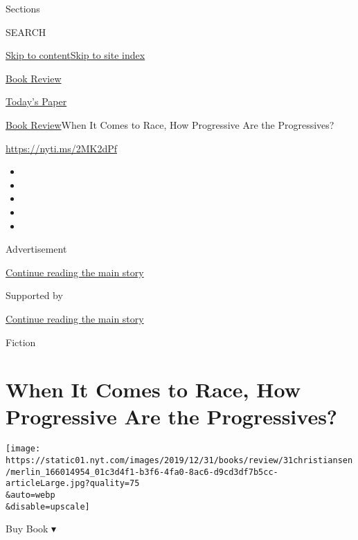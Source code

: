 Sections

SEARCH

\protect\hyperlink{site-content}{Skip to
content}\protect\hyperlink{site-index}{Skip to site index}

\href{https://www.nytimes.com/section/books/review}{Book Review}

\href{https://myaccount.nytimes.com/auth/login?response_type=cookie\&client_id=vi}{}

\href{https://www.nytimes.com/section/todayspaper}{Today's Paper}

\href{/section/books/review}{Book Review}\textbar{}When It Comes to
Race, How Progressive Are the Progressives?

\url{https://nyti.ms/2MK2dPf}

\begin{itemize}
\item
\item
\item
\item
\item
\end{itemize}

Advertisement

\protect\hyperlink{after-top}{Continue reading the main story}

Supported by

\protect\hyperlink{after-sponsor}{Continue reading the main story}

Fiction

\hypertarget{when-it-comes-to-race-how-progressive-are-the-progressives}{%
\section{When It Comes to Race, How Progressive Are the
Progressives?}\label{when-it-comes-to-race-how-progressive-are-the-progressives}}

\texttt{[image: https://static01.nyt.com/images/2019/12/31/books/review/31christiansen/merlin\_166014954\_01c3d4f1-b3f6-4fa0-8ac6-d9cd3df7b5cc-articleLarge.jpg?quality=75\\\&auto=webp\\\&disable=upscale]}

Buy Book ▾

